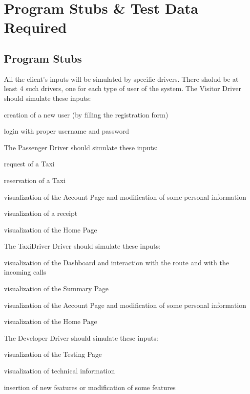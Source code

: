 \chapter{Program Stubs \& Test Data Required} \label{chap5}

\section{Program Stubs}
All the client's inputs will be simulated by specific drivers. There sholud be at least 4 such drivers, one for each type of user of the system.
The Visitor Driver should simulate these inputs:
\begin{itemize*}
	\item creation of a new user (by filling the registration form)
	\item login with proper username and password
\end{itemize*}

The Passenger Driver should simulate these inputs:
\begin{itemize*}
	\item request of a Taxi
	\item reservation of a Taxi
	\item visualization of the Account Page and modification of some personal information
	\item visualization of a receipt
	\item visualization of the Home Page
\end{itemize*}

The TaxiDriver Driver should simulate these inputs:
\begin{itemize*}
	\item visualization of the Dashboard and interaction with the route and with the incoming calls
	\item visualization of the Summary Page
	\item visualization of the Account Page and modification of some personal information
	\item visualization of the Home Page
\end{itemize*}

The Developer Driver should simulate these inputs:
\begin{itemize*}
	\item visualization of the Testing Page
	\item visualization of technical information
	\item insertion of new features or modification of some features
\end{itemize*}

